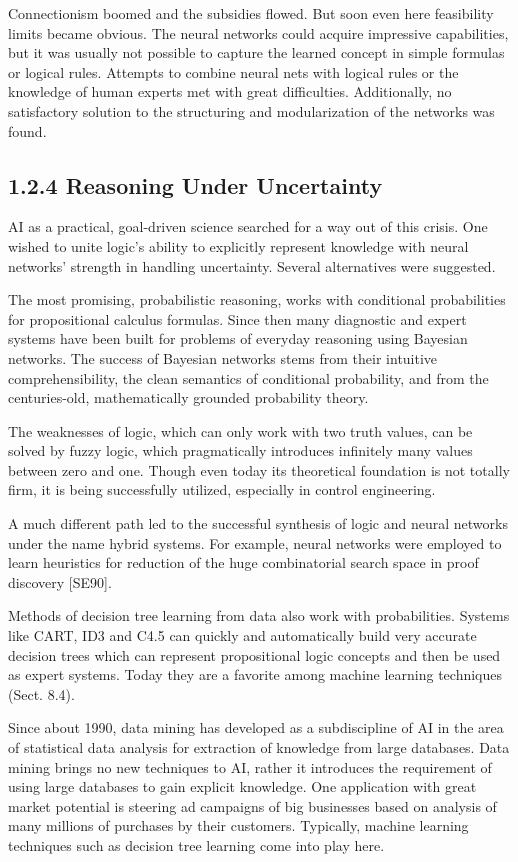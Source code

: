 \documentclass[10pt]{article}
\begin{document}
Connectionism boomed and the subsidies flowed. But soon even here feasibility limits became obvious. The neural networks could acquire impressive capabilities, but it was usually not possible to capture the learned concept in simple formulas or logical rules. Attempts to combine neural nets with logical rules or the knowledge of human experts met with great difficulties. Additionally, no satisfactory solution to the structuring and modularization of the networks was found.

\subsection*{1.2.4 Reasoning Under Uncertainty}
AI as a practical, goal-driven science searched for a way out of this crisis. One wished to unite logic's ability to explicitly represent knowledge with neural networks' strength in handling uncertainty. Several alternatives were suggested.

The most promising, probabilistic reasoning, works with conditional probabilities for propositional calculus formulas. Since then many diagnostic and expert systems have been built for problems of everyday reasoning using Bayesian\\
networks. The success of Bayesian networks stems from their intuitive comprehensibility, the clean semantics of conditional probability, and from the centuries-old, mathematically grounded probability theory.


The weaknesses of logic, which can only work with two truth values, can be solved by fuzzy logic, which pragmatically introduces infinitely many values between zero and one. Though even today its theoretical foundation is not totally firm, it is being successfully utilized, especially in control engineering.

A much different path led to the successful synthesis of logic and neural networks under the name hybrid systems. For example, neural networks were employed to learn heuristics for reduction of the huge combinatorial search space in proof discovery [SE90].

Methods of decision tree learning from data also work with probabilities. Systems like CART, ID3 and C4.5 can quickly and automatically build very accurate decision trees which can represent propositional logic concepts and then be used as expert systems. Today they are a favorite among machine learning techniques (Sect. 8.4).

Since about 1990, data mining has developed as a subdiscipline of AI in the area of statistical data analysis for extraction of knowledge from large databases. Data mining brings no new techniques to AI, rather it introduces the requirement of using large databases to gain explicit knowledge. One application with great market potential is steering ad campaigns of big businesses based on analysis of many millions of purchases by their customers. Typically, machine learning techniques such as decision tree learning come into play here.
\end{document}
